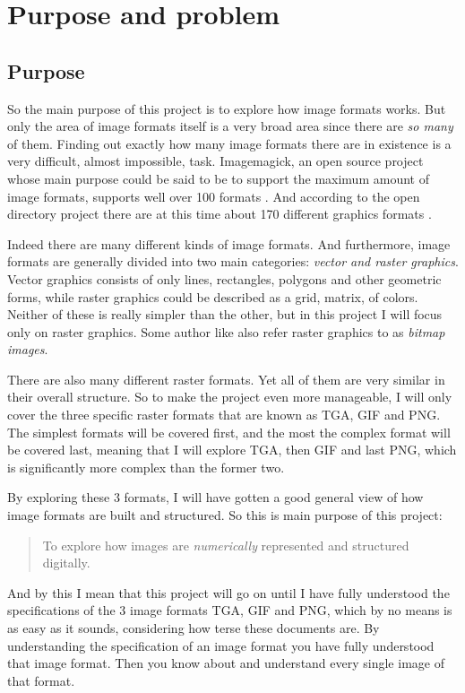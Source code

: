 \begin{comment}
  
\end{comment}

\chapter{Purpose and problem}

\section{Purpose}

So the main purpose of this project is to explore how image formats
works. But only the area of image formats itself is a very broad area
since there are \textit{so many} of them. Finding out exactly how
many image formats there are in existence is a very difficult, almost
impossible, task. Imagemagick, an open source project whose main purpose
could be said to be to support the maximum amount of image formats,
supports well over 100 formats \cite{11:imagemagick_home}. And
according to the open directory project there are at this time about
170 different graphics formats \cite{10:opendirectory_data_formats}.

Indeed there are many different kinds of image formats. And
furthermore, image formats are generally divided into two main
categories: \textit{vector and raster
graphics}\cite{murray1996encyclopedia,roelofs99:_png}. Vector graphics
consists of only lines, rectangles, polygons and other geometric
forms, while raster graphics could be described as a grid, matrix, of
colors. Neither of these is really simpler than the other, but in this
project I will focus only on raster graphics. Some author like
\cite{murray1996encyclopedia} also refer raster graphics to as \textit{bitmap
images}.

There are also many different raster formats. Yet all of them are very
similar in their overall structure. So to make the project even more
manageable, I will only cover the three specific raster formats that
are known as TGA, GIF and PNG. The simplest formats will be covered
first, and the most the complex format will be covered last, meaning
that I will explore TGA, then GIF and last PNG, which is significantly
more complex than the former two.

By exploring these 3 formats, I will have gotten a good general view
of how image formats are built and structured. So this is main purpose
of this project:

\begin{quote}
  To explore how images are \textit{numerically} represented and
  structured digitally.
\end{quote}

And by this I mean that this project will go on until I have fully
understood the specifications of the 3 image formats TGA, GIF and PNG,
which by no means is as easy as it sounds, considering how terse these
documents are. By understanding the specification of an image format
you have fully understood that image format. Then you know about and
understand every single image of that format.
